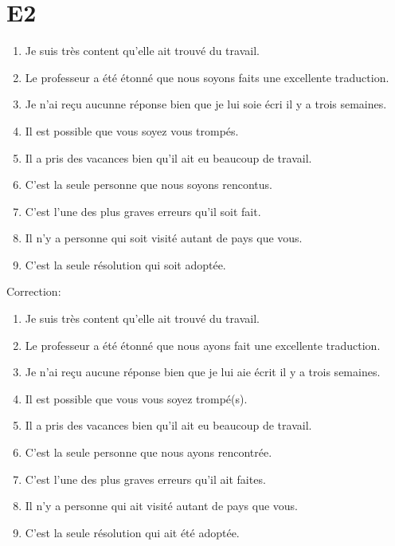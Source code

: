 \documentclass{book}
\begin{document}
    \section{E2}
        \begin{enumerate}
            \item Je suis très content qu'elle ait trouvé du travail.
            \item Le professeur a été étonné que nous soyons faits une excellente traduction.
            \item Je n'ai reçu aucunne réponse bien que je lui soie écri il y a trois semaines.
            \item Il est possible que vous soyez vous trompés.
            \item Il a pris des vacances bien qu'il ait eu beaucoup de travail.
            \item C'est la seule personne que nous soyons rencontus.
            \item C'est l'une des plus graves erreurs qu'il soit fait.
            \item Il n'y a personne qui soit visité autant de pays que vous.
            \item C'est la seule résolution qui soit adoptée.
        \end{enumerate}
        Correction:
        \begin{enumerate}
            \item Je suis très content qu'elle ait trouvé du travail.
            \item Le professeur a été étonné que nous ayons fait une excellente traduction.
            \item Je n'ai reçu aucune réponse bien que je lui aie écrit il y a trois semaines.
            \item Il est possible que vous vous soyez trompé(s).
            \item Il a pris des vacances bien qu'il ait eu beaucoup de travail.
            \item C'est la seule personne que nous ayons rencontrée.
            \item C'est l'une des plus graves erreurs qu'il ait faites.
            \item Il n'y a personne qui ait visité autant de pays que vous.
            \item C'est la seule résolution qui ait été adoptée.
        \end{enumerate}
\end{document}
